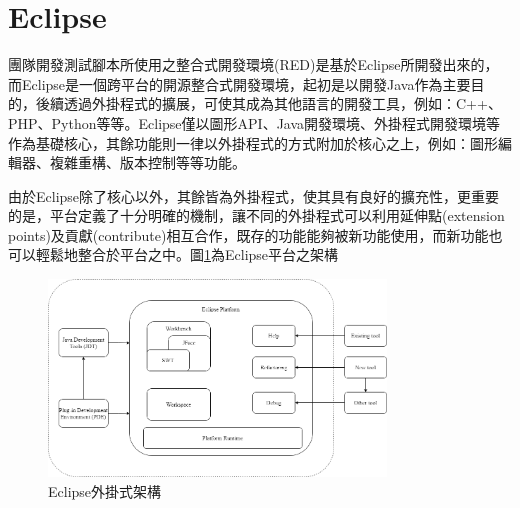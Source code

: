 
%
%
%
%    
%
%

\section{Eclipse}\label{s2.4}
\indent
團隊開發測試腳本所使用之整合式開發環境(RED)是基於Eclipse所開發出來的，而Eclipse\cite{Eclipse}是一個跨平台的開源整合式開發環境，起初是以開發Java作為主要目的，後續透過外掛程式的擴展，可使其成為其他語言的開發工具，例如：C++、PHP、Python等等。Eclipse僅以圖形API、Java開發環境、外掛程式開發環境等作為基礎核心，其餘功能則一律以外掛程式的方式附加於核心之上，例如：圖形編輯器、複雜重構、版本控制等等功能。

\indent
由於Eclipse除了核心以外，其餘皆為外掛程式，使其具有良好的擴充性，更重要的是，平台定義了十分明確的機制，讓不同的外掛程式可以利用延伸點(extension points)及貢獻(contribute)相互合作，既存的功能能夠被新功能使用，而新功能也可以輕鬆地整合於平台之中。圖\ref{f2.6}為Eclipse平台之架構\cite{EclipseStructure}

\begin{figure}[H]
    \centering
    \includegraphics[width=0.8\textwidth]{picture/eclipse_structure.png}
    \caption{Eclipse外掛式架構\cite{EclipseStructure}}
    \label{f2.6}
\end{figure}

